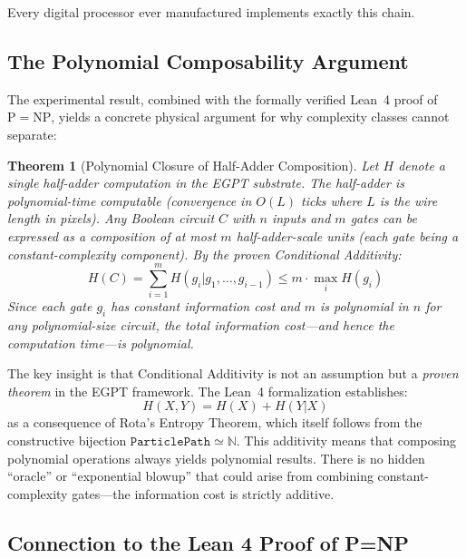 \documentclass[11pt,a4paper]{article}
\newtheorem{theorem}{Theorem}[section]
\begin{document}
Every digital processor ever manufactured implements exactly this chain.

\subsection{The Polynomial Composability Argument}
\label{subsec:polynomial}

The experimental result, combined with the formally verified Lean~4 proof of $\mathrm{P} = \mathrm{NP}$, yields a concrete physical argument for why complexity classes cannot separate:

\begin{theorem}[Polynomial Closure of Half-Adder Composition]
\label{thm:poly_closure}
Let $H$ denote a single half-adder computation in the EGPT substrate. The half-adder is polynomial-time computable (convergence in $O(L)$ ticks where $L$ is the wire length in pixels). Any Boolean circuit $C$ with $n$ inputs and $m$ gates can be expressed as a composition of at most $m$ half-adder-scale units (each gate being a constant-complexity component). By the proven Conditional Additivity:
\begin{equation}
    H(C) = \sum_{i=1}^{m} H(g_i | g_1, \ldots, g_{i-1}) \leq m \cdot \max_i H(g_i)
\end{equation}
Since each gate $g_i$ has constant information cost and $m$ is polynomial in $n$ for any polynomial-size circuit, the total information cost---and hence the computation time---is polynomial.
\end{theorem}

The key insight is that Conditional Additivity is not an assumption but a \emph{proven theorem} in the EGPT framework. The Lean~4 formalization establishes:
\begin{equation}
    H(X,Y) = H(X) + H(Y|X)
\end{equation}
as a consequence of Rota's Entropy Theorem, which itself follows from the constructive bijection $\texttt{ParticlePath} \simeq \mathbb{N}$. This additivity means that composing polynomial operations always yields polynomial results. There is no hidden ``oracle'' or ``exponential blowup'' that could arise from combining constant-complexity gates---the information cost is strictly additive.

\subsection{Connection to the Lean 4 Proof of P=NP}
\end{document}
